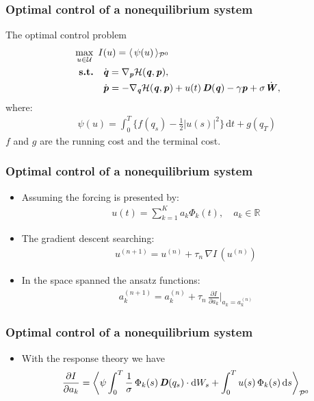 \documentclass[fleqn]{beamer}
\newcommand{\bluec}[1]{{\color{blue} #1}}
\newcommand{\vect}[1]{\textbf{\textit{#1}}}
\newcommand{\dd}[0]{\textrm{d}}
\newcommand{\fe}{u}
\newcommand{\mh}{\mathcal H}
\newcommand{\pathmeas}{\mathcal P}
\begin{document}
\begin{frame}
  \frametitle{{Optimal control of a nonequilibrium system}}
  The optimal control problem
  \bluec{
    \begin{align*}
      \max_{u\in\mathcal U} \ I&(u) = \langle\, \psi (u) \,\rangle_{\pathmeas^0}\\
      \textbf{s.t.} \quad&
        \dot{\vect q}  = \nabla_{\vect p}\mh(\vect q,\vect p), \\
        &\dot{\vect p}  =- \nabla_{\vect q}\mh(\vect q,\vect p)
        + \fe(t)\, \vect D(\vect q)
        - \gamma\vect p
        + \sigma\dot{\vect W},      
    \end{align*}
  }
  where:
  \bluec{
    \begin{align*}
      \psi(u) =
      \int_0^T
      \Big\{ f(q_s) - \frac12\vert u(s)\vert^2\Big\}\, \dd t + g(q_T)\,
    \end{align*}
  }
  \bluec{$f$} and \bluec{$g$} are the running cost and the terminal cost.
\end{frame}


\begin{frame}
  \frametitle{Optimal control of a nonequilibrium system}
  \begin{itemize}
  \item<1-> 
    Assuming the forcing is presented by:
    \bluec{
      \begin{align*}
        u(t) = \sum_{k = 1}^K a_k\Phi_k(t), \quad a_k\in \mathbb R
      \end{align*}
    }
  \item<2-> The gradient descent searching:
    \bluec{
      \begin{align*}
        u^{(n+1)} = u^{(n)} + \tau_n \,\nabla I\,(u^{(n)})
      \end{align*}
    }
  \item<3-> In the space spanned the ansatz functions:
    \bluec{
      \begin{align*}
        a_k^{(n+1)}   = a_k^{(n)} +
        \tau_n \,\frac{\partial I}{\partial a_k} \bigg\vert_{a_k = a_k^{(n)}}
      \end{align*}
    }
  \end{itemize}
\end{frame}


\begin{frame}
  \frametitle{Optimal control of a nonequilibrium system}
  \begin{itemize}
  \item<1-> With the response theory we have
    \bluec{
      \begin{align*}
        \frac{\partial I}{\partial a_k} =
        \bigg\langle
        \psi \int_0^T\frac1\sigma\,\Phi_k(s)\,\vect D(q_s)\cdot \dd W_s
        +
        \int_0^T u(s)\,\Phi_k(s)\,\dd s
        \bigg\rangle_{\pathmeas^0}
      \end{align*}
    }
  \end{itemize}
\end{frame}
\end{document}
